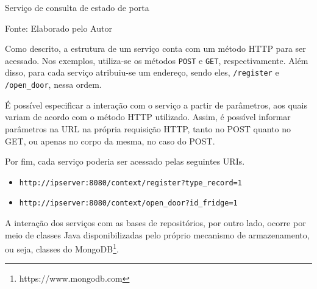 \begin{quadro}[htb]
    \caption{Serviço de consulta de estado de porta}
    \label{fig:cap4_service-status-door}
    
    \footnotesize{Fonte: Elaborado pelo Autor}
\end{quadro}


Como descrito, a estrutura de um serviço conta com um método HTTP para ser acessado. Nos exemplos, utiliza-se os métodos \texttt{POST} e \texttt{GET}, respectivamente. Além disso, para cada serviço atribuiu-se um endereço, sendo eles, \texttt{/register} e \texttt{/open\_door}, nessa ordem. 


É possível especificar a interação com o serviço a partir de parâmetros, aos quais variam de acordo com o método HTTP utilizado. Assim, é possível informar parâmetros na URL na própria requisição HTTP, tanto no POST quanto no GET, ou apenas no corpo da mesma, no caso do POST.

Por fim, cada serviço poderia ser acessado pelas seguintes URIs.

\begin{itemize} \parskip -4pt
    \item \texttt{http://ipserver:8080/context/register?type\_record=1}
    \item \texttt{http://ipserver:8080/context/open\_door?id\_fridge=1}
\end{itemize}

A interação dos serviços com as bases de repositórios, por outro lado, ocorre por meio de classes Java disponibilizadas pelo próprio mecanismo de armazenamento, ou seja, classes do MongoDB\textsuperscript{\textregistered}\footnote{https://www.mongodb.com}.

